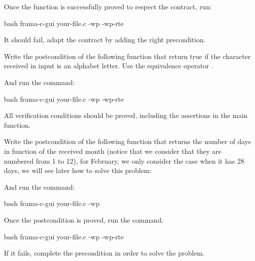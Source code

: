 Once the function is successfully proved to respect the contract, run:


\begin{CodeBlock}{bash}
frama-c-gui your-file.c -wp -wp-rte
\end{CodeBlock}


It should fail, adapt the contract by adding the right precondition.






Write the postcondition of the following function that return true if
the character received in input is an alphabet letter. Use the equivalence
operator \CodeInline{<==>}.





And run the command:


\begin{CodeBlock}{bash}
frama-c-gui your-file.c -wp -wp-rte
\end{CodeBlock}


All verification conditions should be proved, including the assertions in the
main function.






Write the postcondition of the following function that returns the number
of days in function of the received month (notice that we consider that
they are numbered from 1 to 12), for February, we only consider the case
when it has 28 days, we will see later how to solve this problem:





And run the command:


\begin{CodeBlock}{bash}
frama-c-gui your-file.c -wp
\end{CodeBlock}


Once the postcondition is proved, run the command:



\begin{CodeBlock}{bash}
frama-c-gui your-file.c -wp -wp-rte
\end{CodeBlock}



If it fails, complete the precondition in order to solve the problem.



